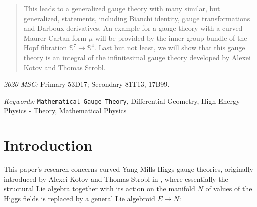 \documentclass[a4paper,oneside,11pt,bibliography=totoc]{scrartcl}
\theoremstyle{plain}
\theoremstyle{remark}
\theoremstyle{definition}
\begin{document}
\begin{titlepage}
\begin{center}
\begin{abstract}
{This leads to a generalized gauge theory with many similar, but generalized, statements, including Bianchi identity, gauge transformations and Darboux derivatives. An example for a gauge theory with a curved Maurer-Cartan form $\mu$ will be provided by the inner group bundle of the Hopf fibration $\mathds{S}^7 \to \mathds{S}^4$. Last but not least, we will show that this gauge theory is an integral of the infinitesimal gauge theory developed by Alexei Kotov and Thomas Strobl.
}
 \end{abstract}
\end{center}

\textit{2020 MSC:} Primary 53D17; Secondary 81T13, 17B99.

\textit{Keywords:} \texttt{Mathematical Gauge Theory}, Differential Geometry, High Energy Physics - Theory, Mathematical Physics

\end{titlepage}




\tableofcontents





\renewcommand{\thefootnote}{\arabic{footnote}}
%
\setlength{\parindent}{12 pt}




\section{Introduction}

This paper's research concerns curved Yang-Mills-Higgs gauge theories, originally introduced by Alexei Kotov and Thomas Strobl in \cite{CurvedYMH}, where essentially the structural Lie algebra together with its action on the manifold $N$ of values of the Higgs fields is replaced by a general Lie algebroid $E \to N$:
\end{document}
